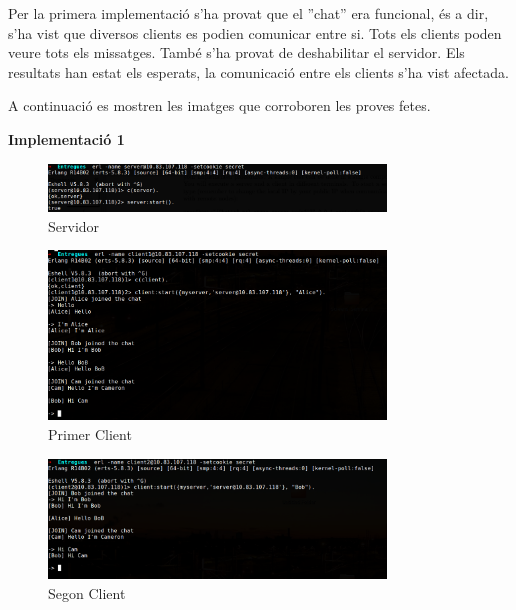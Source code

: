 \documentclass[a4paper, 11pt]{article}
\begin{document}
Per la primera implementació s'ha provat que el ''chat'' era funcional, és a
dir, s'ha vist que diversos clients es podien comunicar entre si. Tots els
clients poden veure tots els missatges.  També s'ha provat de deshabilitar el
servidor. Els resultats han estat els esperats, la comunicació entre els clients
s'ha vist afectada.

A continuació es mostren les imatges que corroboren les proves fetes.

\begin{center} 
	\textbf{Implementació 1}
\end{center}
\begin{figure}[H]
    \centering   
    \includegraphics[width=0.8\textwidth]{figures/Server1_start}
    \caption{Servidor \label{fig:Impl1_Server}}    
\end{figure}
    
\begin{figure}[H]
    \centering   
	\includegraphics[width=0.8\textwidth]{figures/Server1_Al}
    \caption{Primer Client \label{fig:Impl1_Al}}	
\end{figure}

\begin{figure}[H]
    \centering   
	\includegraphics[width=0.8\textwidth]{figures/Server1_Bob}
    \caption{Segon Client \label{fig:Impl1_Bob}}    
\end{figure}    
    
\end{document}

